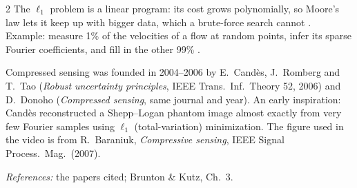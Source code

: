 \begin{paracol}{2}
The $\ell_1$ problem is a linear program: its cost grows polynomially, so Moore's law lets it keep up with
bigger data, which a brute-force search cannot . Example: measure 1\% of the
velocities of a flow at random points, infer its sparse Fourier coefficients, and fill in the other 99\%
.

\begin{history}
Compressed sensing was founded in 2004--2006 by E.~Cand\`es, J.~Romberg and T.~Tao (\emph{Robust
uncertainty principles}, IEEE Trans.\ Inf.\ Theory 52, 2006) and D.~Donoho (\emph{Compressed sensing},
same journal and year). An early inspiration: Cand\`es reconstructed a Shepp--Logan phantom image almost
exactly from very few Fourier samples using $\ell_1$ (total-variation) minimization. The figure used in the
video is from R.~Baraniuk, \emph{Compressive sensing}, IEEE Signal Process.\ Mag.\ (2007).\par
\textit{References:} the papers cited; Brunton \& Kutz, Ch.~3.
\end{history}


\end{paracol}
